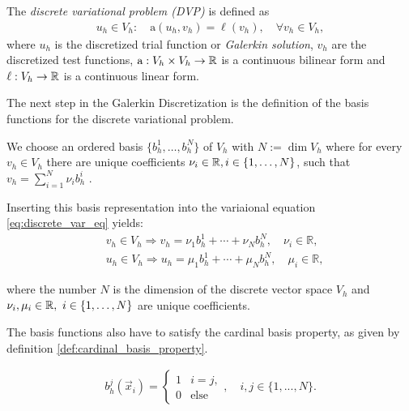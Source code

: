 \begin{definition}
    \label{def:discrete_var_prob}
    The \emph{discrete variational problem (DVP)} is defined as
    \cite[Def.~2.2.1.1]{hiptmair_numerical_2023}
    \begin{align}
        \label{eq:discrete_var_eq}
        u_h \in V_{h}: \quad \mathrm{a}(u_h, v_h) = \ell(v_h), \quad \forall v_h \in V_{h},
    \end{align}
    where $u_h$ is the discretized trial function or \emph{Galerkin solution},
    $v_h$ are the discretized test functions, $\mathrm{a}: V_h \times V_h \to \mathbb{R}$
    is a continuous bilinear form and $\ell: V_h \to \mathbb{R}$ is a continuous linear form.
\end{definition}

The next step in the Galerkin Discretization is the definition of the basis
functions for the discrete variational problem.

We choose an ordered basis $\{b_h^1, \dots, b_h^N\}$ of $V_{h}$ with $N := \dim V_{h}$
where for every $v_h \in V_h$ there are unique coefficients $\nu_i \in \mathbb{R}, i \in \{ 1, \dots, N \}$,
such that $v_h = \sum_{i=1}^{N} \nu_i b_h^i$ \cite[Def.~0.3.1.2]{hiptmair_numerical_2023}.

Inserting this basis representation into the variaional equation \ref{eq:discrete_var_eq} yields:
\begin{align}
     & v_h \in V_{h} \Rightarrow v_h = \nu_1 b_h^1+\cdots+\nu_N b_h^N, \quad \nu_i \in \mathbb{R}, \\
     & u_h \in V_{h} \Rightarrow u_h = \mu_1 b_h^1+\cdots+\mu_N b_h^N, \quad \mu_i \in \mathbb{R},
\end{align}

where the number $N$ is the dimension of the discrete vector space $V_{h}$ and $\nu_i, \mu_i \in \mathbb{R}, \ i \in \{1, \dots, N\}$
are unique coefficients.

The basis functions also have to satisfy the cardinal basis property, as given by definition \ref{def:cardinal_basis_property}.

\begin{definition}
    \label{def:cardinal_basis_property}

    \begin{align}
        b_h^j(\vec{x}_i) = \begin{cases}
                               1 & i = j,      \\
                               0 & \text{else}
                           \end{cases}, \quad
        i,j \in \{ 1, ..., N \}.
    \end{align}
\end{definition}

